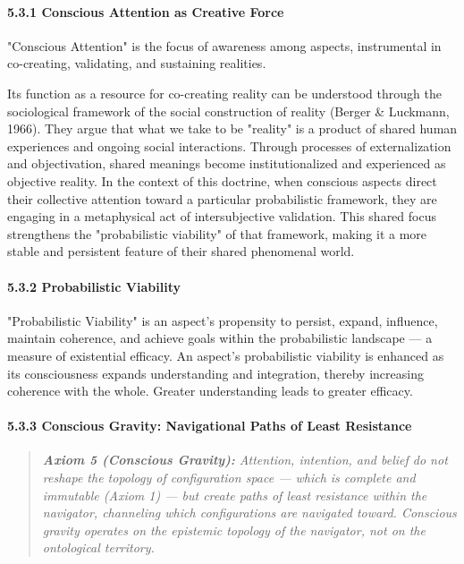 \paragraph*{5.3.1 Conscious Attention as Creative Force}


"Conscious Attention" is the focus of awareness among aspects, instrumental in co-creating, validating, and sustaining realities.


Its function as a resource for co-creating reality can be understood through the sociological framework of the social construction of reality (Berger \& Luckmann, 1966). They argue that what we take to be "reality" is a product of shared human experiences and ongoing social interactions. Through processes of externalization and objectivation, shared meanings become institutionalized and experienced as objective reality. In the context of this doctrine, when conscious aspects direct their collective attention toward a particular probabilistic framework, they are engaging in a metaphysical act of intersubjective validation. This shared focus strengthens the "probabilistic viability" of that framework, making it a more stable and persistent feature of their shared phenomenal world.


\paragraph*{5.3.2 Probabilistic Viability}


"Probabilistic Viability" is an aspect's propensity to persist, expand, influence, maintain coherence, and achieve goals within the probabilistic landscape — a measure of existential efficacy. An aspect's probabilistic viability is enhanced as its consciousness expands understanding and integration, thereby increasing coherence with the whole. Greater understanding leads to greater efficacy.


\paragraph*{5.3.3 Conscious Gravity: Navigational Paths of Least Resistance}


\begin{quote}
\itshape
\textbf{Axiom 5 (Conscious Gravity):} \textit{Attention, intention, and belief do not reshape the topology of configuration space — which is complete and immutable (Axiom 1) — but create paths of least resistance within the navigator, channeling which configurations are navigated toward. Conscious gravity operates on the epistemic topology of the navigator, not on the ontological territory.}
\end{quote}


